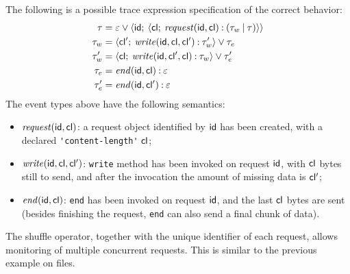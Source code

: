 
The following is a possible trace expression specification of the correct behavior:
\begin{align*}
\tau &= \varepsilon \mathbin{\vee} {\langle}\mathsf{id};\:{{\langle}\mathsf{cl};\:{ \mathit{request}(\mathsf{id}, \mathsf{cl}) \mathbin{:} (\tau_w\mathbin{|}\tau)}{\rangle}}{\rangle}\\
\tau_w &= {\langle}\mathsf{cl'};\:{\mathit{write}(\mathsf{id}, \mathsf{cl}, \mathsf{cl'})\mathbin{:}\tau_w'}{\rangle} \mathbin{\vee} \tau_e\\
\tau_w' &= {\langle}\mathsf{cl};\:{\mathit{write}(\mathsf{id}, \mathsf{cl'}, \mathsf{cl})\mathbin{:} \tau_w}{\rangle} \mathbin{\vee} \tau_e'\\
\tau_e &= \mathit{end}(\mathsf{id}, \mathsf{cl})\mathbin{:} \varepsilon\\
\tau_e' &= \mathit{end}(\mathsf{id}, \mathsf{cl'})\mathbin{:}\varepsilon
\end{align*}
The event types above have the following semantics:
\begin{itemize}
\item  \(\mathit{request}(\mathsf{id}, \mathsf{cl})\): a request object identified by \(\mathsf{id}\) has been created, with a declared \lstinline{'content-length'} \(\mathsf{cl}\);
\item \(\mathit{write}(\mathsf{id}, \mathsf{cl}, \mathsf{cl'})\): \lstinline{write} method has been invoked on request \(\mathsf{id}\), with \(\mathsf{cl}\) bytes still to send, and after the invocation the amount of missing data is \(\mathsf{cl'}\);
\item \(\mathit{end}(\mathsf{id}, \mathsf{cl})\): \lstinline{end} has been invoked on request \(\mathsf{id}\), and the last \(\mathsf{cl}\) bytes are sent (besides finishing the request, \lstinline{end} can also send a final chunk of data).
\end{itemize}

The shuffle operator, together with the unique identifier of each request, allows monitoring of multiple concurrent requests.
This is similar to the previous example on files.

